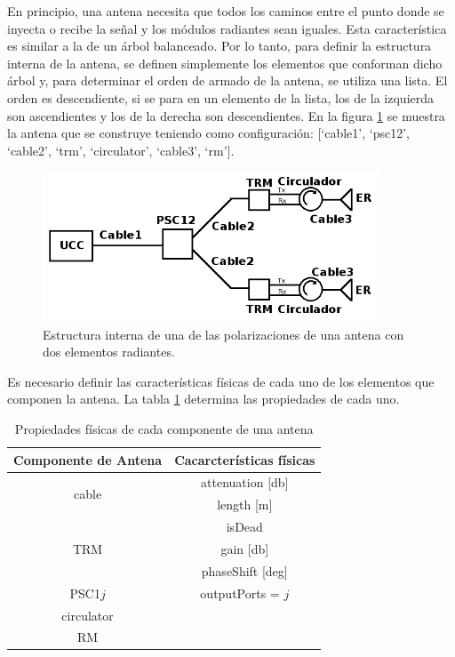 En principio, una antena necesita que todos los caminos entre el punto donde se inyecta o recibe la se\~nal y los m\'odulos 
radiantes sean iguales. Esta caracter\'istica es similar a la de un \'arbol balanceado. Por lo tanto, para definir la 
estructura interna de la antena, se definen simplemente los elementos que conforman dicho \'arbol y, para determinar el orden 
de armado de la antena, se utiliza una lista. El orden es descendiente, si se para en un elemento de la lista, los de la 
izquierda son ascendientes y los de la derecha son descendientes. En la figura \ref{fig:2RMAntenna} se muestra la antena que 
se construye teniendo como configuración: [\enquote*{cable1}, \enquote*{psc12}, \enquote*{cable2}, \enquote*{trm}, 
\enquote*{circulator}, \enquote*{cable3}, \enquote*{rm}].

\begin{figure}
 \centering
 \includegraphics[width=10cm]{gfx/RFDN.png}
 \caption{Estructura interna de una de las polarizaciones de una antena con dos elementos radiantes.}
 \label{fig:2RMAntenna}
\end{figure}

Es necesario definir las características físicas de cada uno de los elementos que componen la antena. La tabla 
\ref{tab:propertiesOfComponents} determina las propiedades de cada uno.

\begin{table}[H]
  \footnotesize
  \centering
  \begin{tabular}{|c|c|}
	\hline
	\textbf{Componente de Antena} & \textbf{Cacarcterísticas físicas} \tabularnewline \hline 
	\multirow{2}{*}{cable} &  attenuation [db] \tabularnewline \cline{2-2}
	 & length [m] \tabularnewline \hline 
	\multirow{3}{*}{TRM} & isDead \tabularnewline \cline{2-2}
	 & gain [db]\tabularnewline \cline{2-2}
	 & phaseShift [deg] \tabularnewline \hline 
	PSC1$j$ & outputPorts = $j$ \tabularnewline \hline 
	circulator & \tabularnewline \hline 
	RM & \tabularnewline \hline 
  \end{tabular}
  \caption{Propiedades físicas de cada componente de una antena}
  \label{tab:propertiesOfComponents}
\end{table}

